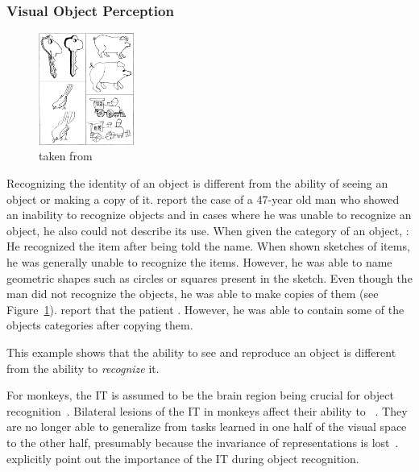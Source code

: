 \subsubsection{Visual Object Perception}\label{subsec:visual-object-perception}

\begin{figure}
    \begin{center}
        \includegraphics[width=0.28\textwidth]{images/rubens_sketches.jpg}
    \end{center}
    \caption[Copies of line drawings]{ taken from \citet{rubens1971associative}}
    \label{fig:copies_line_drawings}
\end{figure}
Recognizing the identity of an object is different from the ability of seeing an object or making a copy of it.
\citet{rubens1971associative} report the case of a 47-year old man who showed an inability to recognize objects and in cases where he was unable to recognize an object, he also could not describe its use.
When given the category of an object, :
He recognized the item after being told the name.
When shown sketches of items, he was generally unable to recognize the items.
However, he was able to name geometric shapes such as circles or squares present in the sketch.
Even though the man did not recognize the objects, he was able to make copies of them (see Figure~\ref{fig:copies_line_drawings}).
\citet{rubens1971associative} report that the patient .
However, he was able to contain some of the objects categories after copying them.

This example shows that the ability to see and reproduce an object is different from the ability to \textit{recognize} it.

For monkeys, the \ac{IT} is assumed to be the brain region being crucial for object recognition~\citep[pp. 1070, 1071]{squire2012fundamental}.
Bilateral lesions of the \ac{IT} in monkeys affect their ability to ~\citep[p. 1070]{squire2012fundamental}.
They are no longer able to generalize from tasks learned in one half of the visual space to the other half, presumably because the invariance of representations is lost~\citep[p. 1070]{squire2012fundamental}.
\citet[p. 1071]{squire2012fundamental} explicitly point out the importance of the \ac{IT} during object recognition.

